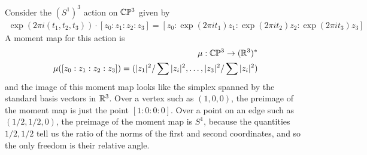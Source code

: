 \documentclass[12pt]{article}
\begin{document}
\begin{example}
	Consider the $(S^1)^3$ action on $\mathbb{C}\mathbb{P}^3$ given by \begin{align*}
		\exp(2\pi i(t_1,t_2,t_3))\cdot [z_0:z_1:z_2:z_3] = [z_0:\exp(2\pi it_1)z_1:\exp(2\pi it_2)z_2:\exp(2\pi it_3)z_3]
	\end{align*} A moment map for this action is \begin{align*}
		\mu:\mathbb{C}\mathbb{P}^3\to (\mathbb{R}^3)^* \\
		\mu([z_0:z_1:z_2:z_3]) = (|z_1|^2/\sum |z_i|^2,\dots,|z_3|^2/\sum |z_i|^2)
	\end{align*} and the image of this moment map looks like the simplex spanned by the standard basis
	vectors in $\mathbb{R}^3$. Over a vertex such as $(1,0,0)$, the preimage of the moment map is just the point
	$[1:0:0:0]$. Over a point on an edge such as $(1/2,1/2,0)$, the preimage of the moment map is $S^1$, because
	the quantities $1/2,1/2$ tell us the ratio of the norms of the first and second coordinates, and so the only freedom
	is their relative angle.
\end{example}
\end{document}

